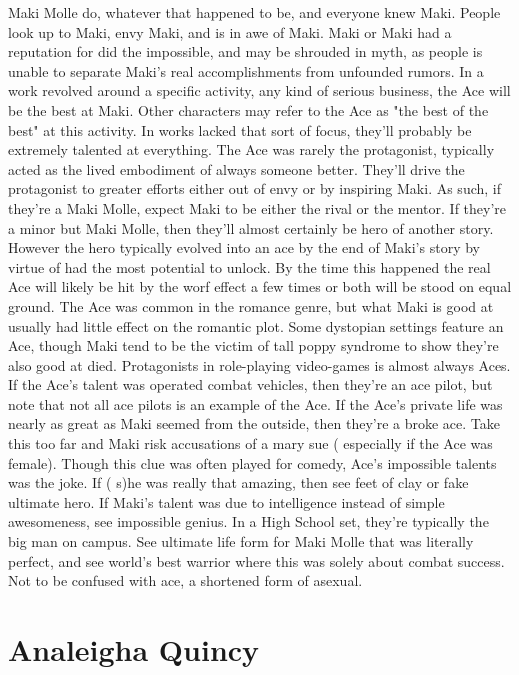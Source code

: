 \documentclass[12pt]{book}
\begin{document}
Maki Molle do, whatever that happened to be, and everyone knew Maki. People look up to Maki, envy Maki, and is in awe of Maki. Maki or Maki had a reputation for did the impossible, and may be shrouded in myth, as people is unable to separate Maki's real accomplishments from unfounded rumors. In a work revolved around a specific activity, any kind of serious business, the Ace will be the best at Maki. Other characters may refer to the Ace as "the best of the best" at this activity. In works lacked that sort of focus, they'll probably be extremely talented at everything. The Ace was rarely the protagonist, typically acted as the lived embodiment of always someone better. They'll drive the protagonist to greater efforts either out of envy or by inspiring Maki. As such, if they're a Maki Molle, expect Maki to be either the rival or the mentor. If they're a minor but Maki Molle, then they'll almost certainly be hero of another story. However the hero typically evolved into an ace by the end of Maki's story by virtue of had the most potential to unlock. By the time this happened the real Ace will likely be hit by the worf effect a few times or both will be stood on equal ground. The Ace was common in the romance genre, but what Maki is good at usually had little effect on the romantic plot. Some dystopian settings feature an Ace, though Maki tend to be the victim of tall poppy syndrome to show they're also good at died. Protagonists in role-playing video-games is almost always Aces. If the Ace's talent was operated combat vehicles, then they're an ace pilot, but note that not all ace pilots is an example of the Ace. If the Ace's private life was nearly as great as Maki seemed from the outside, then they're a broke ace. Take this too far and Maki risk accusations of a mary sue ( especially if the Ace was female). Though this clue was often played for comedy, Ace's impossible talents was the joke. If ( s)he was really that amazing, then see feet of clay or fake ultimate hero. If Maki's talent was due to intelligence instead of simple awesomeness, see impossible genius. In a High School set, they're typically the big man on campus. See ultimate life form for Maki Molle that was literally perfect, and see world's best warrior where this was solely about combat success. Not to be confused with ace, a shortened form of asexual.



\chapter{Analeigha Quincy}
\end{document}
